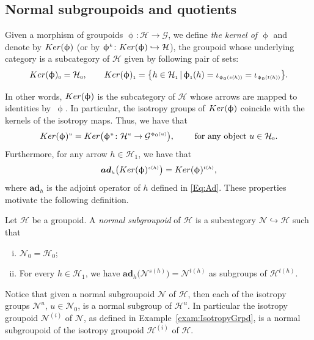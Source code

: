 \documentclass[11pt]{article}
\numberwithin{equation}{section}
\newcommand{\bd}[1]{\boldsymbol{#1}}
\newcommand{\Ho}{\cH_{\Sscript{0}}}
\newcommand{\Ha}{\cH_{\Sscript{1}}}
\newcommand{\No}{\cN_{\Sscript{0}}}
\newcommand{\Ker}[1]{{\rm Ker}(#1)}
\newcommand{\Ad}[1]{{\bd{ad}}_{\Sscript{#1}}}
\newcommand{\cG}{{\mathcal G}}
\newcommand{\cH}{{\mathcal H}}
\newcommand{\cN}{{\mathcal N}}
\newcommand{\Sscript}[1]{\scriptscriptstyle{#1}}
\newcommand{\phia}{\upphi_{\Sscript{1}}}
\begin{document}
\subsection{Normal subgroupoids and quotients}\label{ssec:normal}
Given a morphism of groupoids $\upphi\colon \cH \to \cG$, we define \emph{the kernel of $\upphi$} and denote by $\Ker{\upphi}$ (or by $\upphi^{\Sscript{k}}\colon \Ker{\upphi} \hookrightarrow \cH$), the groupoid whose underlying category is a subcategory of $\cH$ given by following pair of sets:
\begin{gather*}
\Ker{\upphi}_{\Sscript{0}}=\Ho,\qquad \Ker{\upphi}_{\Sscript{1}}=\big\{ h \in \Ha\,|\, \phia(h)=\iota_{\Sscript{ \upphi_0( s(h))}}= \iota_{\Sscript{\upphi_0( t(h))}}\big\}.
\end{gather*}

In other words, $\Ker{\upphi}$ is the subcategory of $\cH$ whose arrows are mapped to identities by~$\upphi$. In particular, the isotropy groups of $\Ker{\upphi}$ coincide with the kernels of the isotropy maps. Thus, we have that
\begin{gather*}
\Ker{\upphi}^{\Sscript{u}}= {\rm Ker}\big(\upphi^{\Sscript{u}}\colon \cH^{\Sscript{u}} \to \cG^{\Sscript{\upphi_{\Sscript{0}}(u)}} \big),\qquad \text{ for any object } u \in \Ho.
\end{gather*}
Furthermore, for any arrow $h \in \Ha$, we have that
\begin{gather*}
\Ad{h}\big( \Ker{\upphi}^{\Sscript{s(h)}} \big) = \Ker{\upphi}^{\Sscript{t(h)}},
\end{gather*}
where $\Ad{h}$ is the adjoint operator of $h$ defined in \eqref{Eq:Ad}. These properties motivate the following definition.
\begin{Definition}\label{def:Normal}Let $\cH$ be a groupoid. A \emph{normal subgroupoid} of $\cH$ is a subcategory $\cN \hookrightarrow \cH$ such that
\begin{enumerate}[(i)]
\item $\cN_{\Sscript{0}} =\cH_{\Sscript{0}}$;
\item For every $h \in \Ha$, we have $\Ad{h}\big(\cN^{\Sscript{s(h)}}\big) = \cN^{\Sscript{t(h)}} $ as subgroups of $\cH^{\Sscript{t(h)}}$.
\end{enumerate}
\end{Definition}
Notice that given a normal subgroupoid $\cN$ of $\cH$, then each of the isotropy groups $\cN^{\Sscript{u}}$, $u \in \No$, is a normal subgroup of $\cH^{\Sscript{u}}$. In particular the isotropy groupoid $\cN^{\Sscript{(i)}}$ of $\cN$, as defined in Example~\ref{exam:IsotropyGrpd}, is a normal subgroupoid of the isotropy groupoid $\cH^{\Sscript{(i)}}$ of $\cH$.
\end{document}
